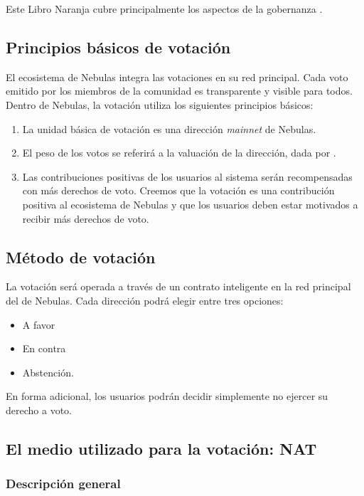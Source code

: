 Este Libro Naranja cubre principalmente los aspectos de la gobernanza \onchain.

\subsection{Principios básicos de votación}

El ecosistema de Nebulas integra las votaciones en su red principal. Cada voto emitido por los miembros de la comunidad es transparente y visible para todos. Dentro de Nebulas, la votación utiliza los siguientes principios básicos:

\begin{enumerate}
	\item La unidad básica de votación es una dirección \textit{mainnet} de Nebulas.
	\item El peso de los votos se referirá a la valuación de la dirección, dada por \nr.
	\item Las contribuciones positivas de los usuarios al sistema serán recompensadas con más derechos de voto. Creemos que la votación es una contribución positiva al ecosistema de Nebulas y que los usuarios deben estar motivados a recibir más derechos de voto.
\end{enumerate}

\subsection{Método de votación}

La votación será operada a través de un contrato inteligente en la red principal del \blockchain de Nebulas. Cada dirección podrá elegir entre tres opciones:

\begin{itemize}
	\item A favor
	\item En contra
	\item Abstención.
\end{itemize}

En forma adicional, los usuarios podrán decidir simplemente no ejercer su derecho a voto.

\subsection{El medio utilizado para la votación: NAT}

\label{nat}

\subsubsection{Descripción general}

